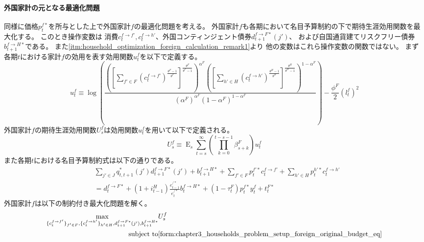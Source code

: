 \paragraph{外国家計の元となる最適化問題}
\label{sec:chapter3_households_problem_setup_foreign_problem}
同様に価格\(p_t^{f*}\)を所与とした上で外国家計\(f\)の最適化問題を考える。
外国家計\(f\)も各期において名目予算制約の下で期待生涯効用関数を最大化する。
このとき操作変数は
消費\(c_t^{f\to f'},c_t^{f\to h'}\)、外国コンティンジェント債券\(d_{t+1}^{f\to F*}(j')\)、
および自国通貨建てリスクフリー債券\(b_{t+1}^{f\to H*}\)である。
また\ref{itm:household_optimization_foreign_calculation_remark1}より
他の変数はこれら操作変数の関数ではない。
まず各期\(t\)における家計\(f\)の効用を表す効用関数\(u_t^f\)を以下で定義する。
\begin{equation}
\label{form:chapter3_households_problem_setup_foreign_original_u_f_def}
    u_t^f\equiv\log\left(\frac{\left(\left[\sum_{f'\in F}(c_t^{f\to f'})^{\frac{\theta^F-1}{\theta^F}}\right]^{\frac{\theta^F}{\theta^F-1}}\right)^{\alpha^F}\left(\left[\sum_{h'\in H}(c_t^{f\to h'})^{\frac{\theta^H-1}{\theta^H}}\right]^{\frac{\theta^H}{\theta^H-1}}\right)^{1-\alpha^F}}{(\alpha^F)^{\alpha^F}(1-\alpha^F)^{1-\alpha^F}}\right)-\frac{\phi^F}{2}(l_t^f)^2
\end{equation}
外国家計\(f\)の期待生涯効用関数\(U_s^f\)は効用関数\(u_t^f\)を用いて以下で定義される。
\begin{equation}
\label{form:chapter3_households_problem_setup_foreign_original_U_f_def}
    U_s^f\equiv\operatorname{E}_s\sum_{t=s}^{\infty}\left(\prod_{k=0}^{t-s-1}\beta_{s+k}^F\right)u_t^f
\end{equation}
また各期\(t\)における名目予算制約式は以下の通りである。
\begin{equation}
\label{form:chapter3_households_problem_setup_foreign_original_budget_eq}
    \begin{split}
        &\sum_{j'\in J}q_{t,t+1}^*(j')d_{t+1}^{f\to F*}(j')+b_{t+1}^{f\to H*}+\sum_{f'\in F}p_t^{f'*}c_t^{f\to f'}+\sum_{h'\in H}p_t^{h'*}c_t^{f\to h'}\\
        &=d_t^{f\to F*}+(1+i_{t-1}^H)\frac{e_{t-1}^{/*}}{e_t^{/*}}b_t^{f\to H*}+(1-\tau_t^F)p_t^{f*}y_t^f+t_t^{F*}
    \end{split}
\end{equation}
外国家計\(f\)は以下の制約付き最大化問題を解く。
\begin{equation}
\label{form:chapter3_households_problem_setup_foreign_original_max}
    \begin{aligned}
        \max_{\{c_t^{f\to f'}\}_{f'\in F},\{c_t^{f\to h'}\}_{h'\in H},d_{t+1}^{f\to F*}(j'),b_{t+1}^{f\to H*}}
        &U_s^f\\
        \text{subject to}
        &\eqref{form:chapter3_households_problem_setup_foreign_original_budget_eq}
    \end{aligned}
\end{equation}

